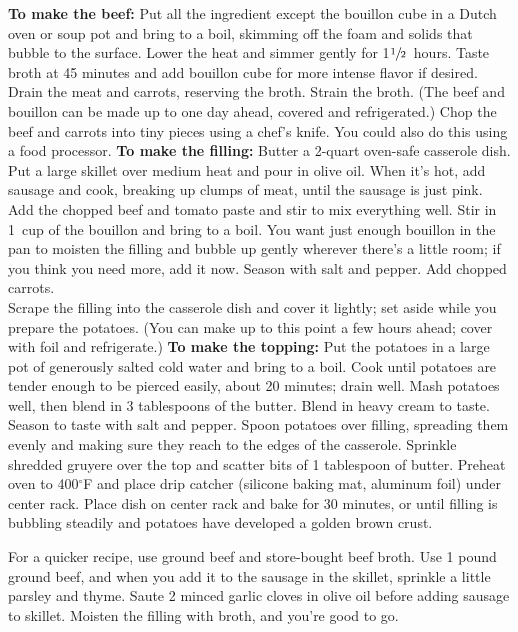 \begin{recipe}
    \preparation
    {
        \step \textbf{To make the beef:} Put all the ingredient except the bouillon cube in a Dutch oven or soup pot and bring to a boil, skimming off the foam and solids that bubble to the surface. Lower the heat and simmer gently for 1$\sfrac{1}{2}$~hours. Taste broth at 45 minutes and add bouillon cube for more intense flavor if desired. 
		\step Drain the meat and carrots, reserving the broth. Strain the broth. (The beef and bouillon can be made up to one day ahead, covered and refrigerated.)
		\step Chop the beef and carrots into tiny pieces using a chef's knife. You could also do this using a food processor.
		\step \textbf{To make the filling:} Butter a 2-quart oven-safe casserole dish.
		\step Put a large skillet over medium heat and pour in olive oil. When it's hot, add sausage and cook, breaking up clumps of meat, until the sausage is just pink. 
		\step Add the chopped beef and tomato paste and stir to mix everything well. 
		\step Stir in 1~cup of the bouillon and bring to a boil. You want just enough bouillon in the pan to moisten the filling and bubble up gently wherever there's a little room; if you think you need more, add it now. Season with salt and pepper.
		\step Add chopped carrots.
		\\
		\step Scrape the filling into the casserole dish and cover it lightly; set aside while you prepare the potatoes. (You can make up to this point a few hours ahead; cover with foil and refrigerate.)
		\step \textbf{To make the topping:} Put the potatoes in a large pot of generously salted cold water and bring to a boil. Cook until potatoes are tender enough to be pierced easily, about 20 minutes; drain well. 
		\step Mash potatoes well, then blend in 3 tablespoons of the butter. Blend in heavy cream to taste. Season to taste with salt and pepper.
		\step Spoon potatoes over filling, spreading them evenly and making sure they reach to the edges of the casserole. Sprinkle shredded gruyere over the top and scatter bits of 1 tablespoon of butter.
		\step Preheat oven to 400$^{\circ}$F and place drip catcher (silicone baking mat, aluminum foil) under center rack. Place dish on center rack and bake for 30 minutes, or until filling is bubbling steadily and potatoes have developed a golden brown crust.
    }
	
	\suggestion
	{
		For a quicker recipe, use ground beef and store-bought beef broth. Use 1 pound ground beef, and when you add it to the sausage in the skillet, sprinkle a little parsley and thyme. Saute 2 minced garlic cloves in olive oil before adding sausage to skillet. Moisten the filling with broth, and you're good to go. 
	}

\end{recipe}
